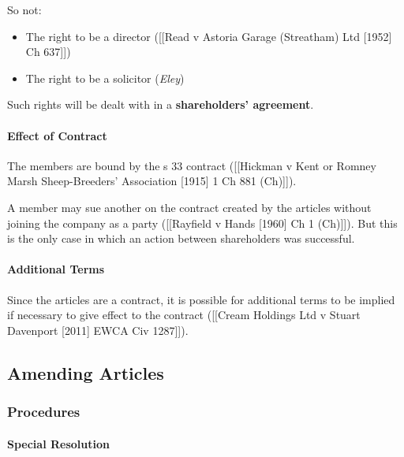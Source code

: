 \documentclass[
]{article}
\providecommand{\tightlist}{%
  \setlength{\itemsep}{0pt}\setlength{\parskip}{0pt}}
\begin{document}
So not:

\begin{itemize}
\tightlist
\item
  The right to be a director ({[}{[}Read v Astoria Garage (Streatham)
  Ltd {[}1952{]} Ch 637{]}{]})
\item
  The right to be a solicitor (\emph{Eley})
\end{itemize}

Such rights will be dealt with in a \textbf{shareholders' agreement}.

\hypertarget{effect-of-contract}{%
\paragraph{Effect of Contract}\label{effect-of-contract}}

The members are bound by the s 33 contract ({[}{[}Hickman v Kent or
Romney Marsh Sheep-Breeders' Association {[}1915{]} 1 Ch 881
(Ch){]}{]}).

A member may sue another on the contract created by the articles without
joining the company as a party ({[}{[}Rayfield v Hands {[}1960{]} Ch 1
(Ch){]}{]}). But this is the only case in which an action between
shareholders was successful.

\hypertarget{additional-terms}{%
\paragraph{Additional Terms}\label{additional-terms}}

Since the articles are a contract, it is possible for additional terms
to be implied if necessary to give effect to the contract ({[}{[}Cream
Holdings Ltd v Stuart Davenport {[}2011{]} EWCA Civ 1287{]}{]}).

\hypertarget{amending-articles}{%
\subsection{Amending Articles}\label{amending-articles}}

\hypertarget{procedures}{%
\subsubsection{Procedures}\label{procedures}}

\hypertarget{special-resolution}{%
\paragraph{Special Resolution}\label{special-resolution}}
\end{document}

